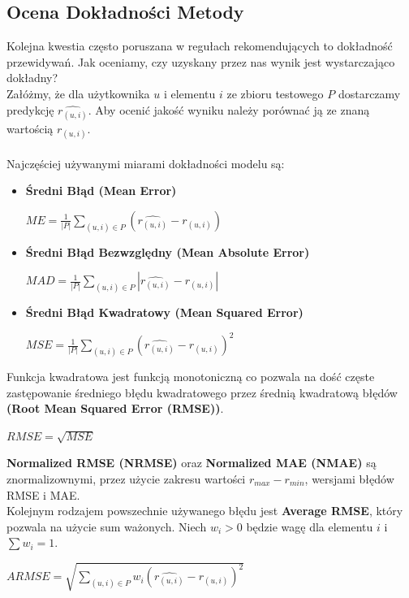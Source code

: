 \documentclass[12pt,a4paper]{report}
\begin{document}
\subsection{Ocena Dokładności Metody}%
Kolejna kwestia często poruszana w regułach rekomendujących to dokładność przewidywań. Jak oceniamy, czy uzyskany przez nas wynik jest wystarczająco dokładny? 
\\Załóżmy, że dla użytkownika $u$ i elementu $i$ ze zbioru testowego $P$ dostarczamy predykcję $\widehat{r_{(u,i)}}$. Aby ocenić jakość wyniku należy porównać ją ze znaną wartością $r_{(u,i)}$.
\\
\\Najczęściej używanymi miarami dokładności modelu są:
\begin{itemize}
\item \textbf{Średni Błąd (Mean Error)}
\begin{center}
$ME = \frac{1}{|P|}\sum_{(u,i)\in P}(\widehat{r_{(u,i)}}-r_{(u,i)})$   
\end{center}

\item \textbf{Średni Błąd Bezwzględny (Mean Absolute Error)}
\begin{center}
$MAD = \frac{1}{|P|}\sum_{(u,i)\in P}|\widehat{r_{(u,i)}}-r_{(u,i)}|$   
\end{center}

\item \textbf{Średni Błąd Kwadratowy (Mean Squared Error)}
\begin{center}
$MSE = \frac{1}{|P|}\sum_{(u,i)\in P}(\widehat{r_{(u,i)}}-r_{(u,i)})^2$   
\end{center}
\end{itemize}
Funkcja kwadratowa jest funkcją monotoniczną co pozwala na dość częste zastępowanie średniego błędu kwadratowego przez średnią kwadratową błędów \textbf{(Root Mean Squared Error (RMSE))}.
\begin{center}
$RMSE = \sqrt{MSE}$
\end{center} 
\textbf{Normalized RMSE (NRMSE)} oraz \textbf{Normalized MAE (NMAE)} są znormalizownymi, przez użycie zakresu wartości $r_{max} - r_{min}$, wersjami błędów RMSE i MAE.
\\Kolejnym rodzajem powszechnie używanego błędu jest \textbf{Average RMSE}, który pozwala na użycie sum ważonych. Niech $w_i>0$ będzie wagę dla elementu $i$ i $\sum w_i = 1$. 
\begin{center}
$ARMSE = \sqrt{\sum_{(u,i)\in P}w_{i}(\widehat{r_{(u,i)}}-r_{(u,i)})^2}$ 
\end{center}
\end{document}
